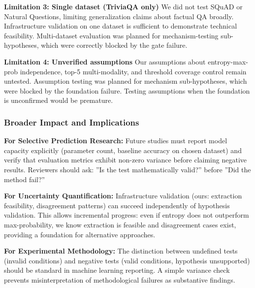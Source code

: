 \textbf{Limitation 3: Single dataset (TriviaQA only)}  
We did not test SQuAD or Natural Questions, limiting generalization claims about factual QA broadly. Infrastructure validation on one dataset is sufficient to demonstrate technical feasibility. Multi-dataset evaluation was planned for mechanism-testing sub-hypotheses, which were correctly blocked by the gate failure.

\textbf{Limitation 4: Unverified assumptions}  
Our assumptions about entropy-max-prob independence, top-5 multi-modality, and threshold coverage control remain untested. Assumption testing was planned for mechanism sub-hypotheses, which were blocked by the foundation failure. Testing assumptions when the foundation is unconfirmed would be premature.

\subsubsection{Broader Impact and Implications}

\textbf{For Selective Prediction Research:}  
Future studies must report model capacity explicitly (parameter count, baseline accuracy on chosen dataset) and verify that evaluation metrics exhibit non-zero variance before claiming negative results. Reviewers should ask: ''Is the test mathematically valid?'' before ''Did the method fail?''

\textbf{For Uncertainty Quantification:}  
Infrastructure validation (ours: extraction feasibility, disagreement patterns) can succeed independently of hypothesis validation. This allows incremental progress: even if entropy does not outperform max-probability, we know extraction is feasible and disagreement cases exist, providing a foundation for alternative approaches.

\textbf{For Experimental Methodology:}  
The distinction between undefined tests (invalid conditions) and negative tests (valid conditions, hypothesis unsupported) should be standard in machine learning reporting. A simple variance check prevents misinterpretation of methodological failures as substantive findings.
